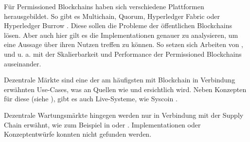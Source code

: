 Für Permissioned Blockchains haben sich verschiedene Plattformen herausgebildet. So gibt es Multichain, Quorum, Hyperledger Fabric oder Hyperledger Burrow \cite{BenHamidaBlockchainEnterpriseOverview2017}. Diese sollen die Probleme der öffentlichen Blockchains lösen. Aber auch hier gilt es die Implementationen genauer zu analysieren, um eine Aussage über ihren Nutzen treffen zu können. So setzen sich Arbeiten von \cite{BenHamidaBlockchainEnterpriseOverview2017}\cite{LiScalablePrivateIndustrial2017}, \cite{PongnumkulPerformanceAnalysisPrivate2017} und \cite{VukolicRethinkingPermissionedBlockchains2017} u. a. mit der Skalierbarkeit und Performance der Permissioned Blockchains auseinander.

Dezentrale Märkte sind eine der am häufigsten mit Blockchain in Verbindung erwähnten Use-Cases, was an Quellen wie \cite{BenHamidaBlockchainEnterpriseOverview2017} und \cite{RavalDecentralizedApplicationsHarnessing2016} ersichtlich wird.
Neben Konzepten für diese (siehe \cite{KaiserDecentralizedPrivateMarketplace2017}), gibt es auch Live-Systeme, wie Syscoin \cite{SidhuSyscoinPeertoPeerElectronic2017}.

Dezentrale Wartungsmärkte hingegen werden nur in Verbindung mit der Supply Chain erwähnt, wie zum Beispiel in \cite{SoldatosWhatDoesBlockchain2017} oder \cite{GotzeLufthansaIndustrySolutions}. Implementationen oder Konzeptentwürfe konnten nicht gefunden werden.